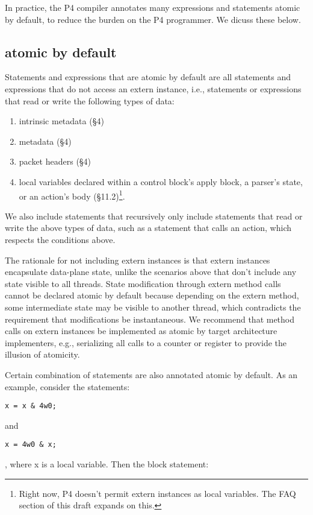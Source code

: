 In practice, the P4 compiler annotates many expressions and statements atomic
by default, to reduce the burden on the P4 programmer. We dicuss these below.

\subsection{atomic by default}
Statements and expressions that are atomic by default are all statements and
expressions that do not access an extern instance, i.e., statements or
expressions that read or write the following types of data:
\begin{enumerate}
\item intrinsic metadata (\S4)
\item metadata (\S4)
\item packet headers (\S4)
\item local variables declared within a control block's apply block, a parser's
state, or an action's body (\S11.2)\footnote{Right now, P4 doesn't permit
extern instances as local variables. The FAQ section of this draft expands on
this.}.

\end{enumerate}
We also include statements that recursively only include statements that read
or write the above types of data, such as a statement that calls an action,
which respects the conditions above.

The rationale for not including extern instances is that extern instances
encapsulate data-plane state, unlike the scenarios above that don't include any
state visible to all threads. State modification through extern method calls
cannot be declared atomic by default because depending on the extern method,
some intermediate state may be visible to another thread, which contradicts the
requirement that modifications be instantaneous. We recommend that method calls
on extern instances be implemented as atomic by target architecture
implementers, e.g., serializing all calls to a counter or register to provide
the illusion of atomicity.

Certain combination of statements are also annotated atomic by default. As an
example, consider the statements:
\begin{verbatim}
x = x & 4w0;
\end{verbatim}

and
\begin{verbatim}
x = 4w0 & x;
\end{verbatim},
where x is a local variable. Then the block statement:

